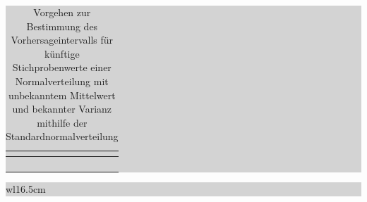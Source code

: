 \begin{table}[H]
\setlength{\arrayrulewidth}{.1em}
\caption{Vorgehen zur Bestimmung des Vorhersageintervalls f\"{u}r k\"{u}nftige Stichprobenwerte einer Normalverteilung mit unbekanntem Mittelwert und bekannter Varianz mithilfe der Standardnormalverteilung}
\setlength{\fboxsep}{0pt}%
\colorbox{lightgray}{%
%
\begin{tabular}{| c | c |}
\hline
\parbox[c][0.3in][c]{0.4in}{\smallskip\centering\textbf{\selectfont{Nr.}}} & 
\parbox[c][0.3in][c]{6.2in}{\smallskip\centering\textbf{\selectfont{Prozessschritt}}}\\ \hline

\parbox[c][0.3in][c]{0.4in}{\centering{}\selectfont{1}} & 
\parbox[c][0.3in][c]{6.2in}{\centering{}\selectfont{Wahl einer Konfidenzzahl $\gamma$}}\\ \hline

\parbox[c][0.9in][c]{0.4in}{\centering{}\selectfont{2}} & 
\parbox[c][0.9in][c]{6.2in}{\centering{}}\\ \hline

\parbox[c][0.9in][c]{0.4in}{\centering{}\selectfont{3}} & 
\parbox[c][0.9in][c]{6.2in}{\centering{}}\\ \hline

\parbox[c][0.9in][c]{0.4in}{\centering{}\selectfont{4}} & 
\parbox[c][0.9in][c]{6.2in}{\centering{}}\\ \hline

\end{tabular}%
}
\label{tab:fivefourteen}
\end{table}

\noindent
\colorbox{lightgray}{%
%
\renewcommand\arraystretch{0.6}%
\begin{tabular}{ wl{16.5cm} }
{\selectfont
{}}
\end{tabular}%
}\medskip

